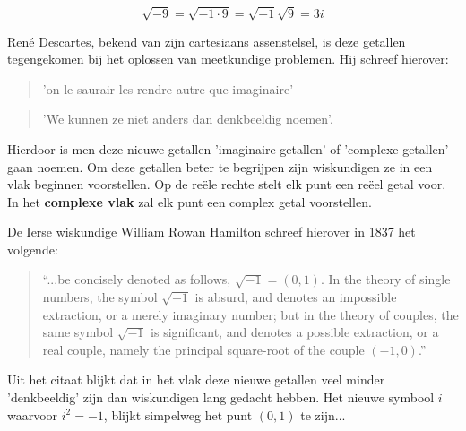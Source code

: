 \documentclass{ximera}
\begin{document}
\[ \sqrt{-9} = \sqrt{-1 \cdot 9} = \sqrt{-1} \sqrt{9} = 3i  \]



René Descartes, bekend van zijn cartesiaans assenstelsel,  is deze getallen tegengekomen bij het oplossen van meetkundige problemen. Hij schreef hierover: 

\begin{quote}
    'on le saurair les rendre autre que imaginaire' 
\end{quote}
\begin{quote}
    'We kunnen ze niet anders dan denkbeeldig noemen'.
\end{quote}

Hierdoor is men deze nieuwe getallen 'imaginaire getallen' of 'complexe getallen' gaan noemen. Om deze getallen beter te begrijpen zijn wiskundigen ze in een vlak beginnen voorstellen. Op de reële rechte stelt elk punt een reëel getal voor. In het \textbf{complexe vlak} zal elk punt een complex getal voorstellen. 

De Ierse wiskundige William Rowan Hamilton schreef hierover in 1837 het volgende: 

\begin{quote}
    “...be concisely denoted as follows, \(\sqrt{-1} = (0, 1)\). In the theory of single numbers, the symbol \(\sqrt{-1}\) is absurd, and denotes an impossible extraction, or a merely imaginary number; but in the theory of couples, the same symbol \(\sqrt{-1}\) is significant, and denotes a possible extraction, or a real couple, namely the principal square-root of the couple \((-1,0)\).”
\end{quote}



Uit het citaat blijkt dat in het vlak deze nieuwe getallen veel minder 'denkbeeldig' zijn dan wiskundigen lang gedacht hebben. Het nieuwe symbool \(i\) waarvoor \(i^2 = -1\),  blijkt simpelweg het punt \((0,1)\) te zijn...
\end{document}

